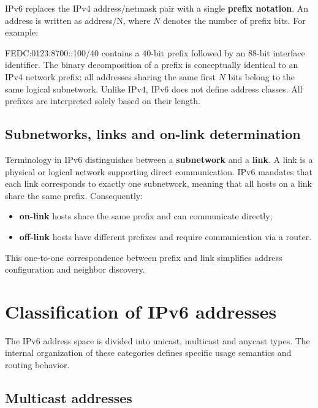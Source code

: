 IPv6 replaces the IPv4 address/netmask pair with a single \textbf{prefix notation}. An address is written as address/N, where $N$ denotes the number of prefix bits. For example:

FEDC:0123:8700::100/40 contains a 40-bit prefix followed by an 88-bit interface identifier. The binary decomposition of a prefix is conceptually identical to an IPv4 network prefix: all addresses sharing the same first $N$ bits belong to the same logical subnetwork. Unlike IPv4, IPv6 does not define address classes. All prefixes are interpreted solely based on their length.

\subsection{Subnetworks, links and on-link determination}

Terminology in IPv6 distinguishes between a \textbf{subnetwork} and a \textbf{link}. A link is a physical or logical network supporting direct communication. IPv6 mandates that each link corresponds to exactly one subnetwork, meaning that all hosts on a link share the same prefix. Consequently:

\begin{itemize}
\item \textbf{on-link} hosts share the same prefix and can communicate directly;
\item \textbf{off-link} hosts have different prefixes and require communication via a router.
\end{itemize}

This one-to-one correspondence between prefix and link simplifies address configuration and neighbor discovery.

\section{Classification of IPv6 addresses}

The IPv6 address space is divided into unicast, multicast and anycast types. The internal organization of these categories defines specific usage semantics and routing behavior.

\begin{center}
\end{center}

\subsection{Multicast addresses}

